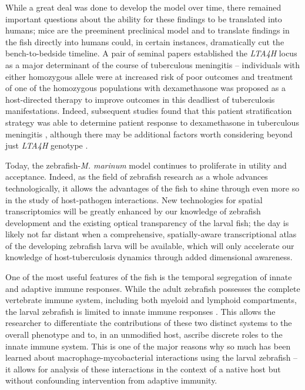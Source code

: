 While a great deal was done to develop the model over time, there remained important questions about the ability for these findings to be translated into humans; mice are the preeminent preclinical model and to translate findings in the fish directly into humans could, in certain instances, dramatically cut the bench-to-bedside timeline. A pair of seminal papers \citep{Tobin2010, Tobin2012} established the \textit{LTA4H} locus as a major determinant of the course of tuberculous meningitis -- individuals with either homozygous allele were at increased risk of poor outcomes and treatment of one of the homozygous populations with dexamethasone was proposed as a host-directed therapy to improve outcomes in this deadliest of tuberculosis manifestations. Indeed, subsequent studies found that this patient stratification strategy was able to determine patient response to dexamethasone in tuberculous meningitis \citep{Thuong2017, Thwaites2013, Thwaites2017, Davis2018, Prasad2016}, although there may be additional factors worth considering beyond just \textit{LTA4H} genotype \citep{Siddiqi2021}.

Today, the zebrafish-\textit{M. marinum} model continues to proliferate in utility and acceptance. Indeed, as the field of zebrafish research as a whole advances technologically, it allows the advantages of the fish to shine through even more so in the study of host-pathogen interactions. New technologies for spatial transcriptomics will be greatly enhanced by our knowledge of zebrafish development and the existing optical transparency of the larval fish; the day is likely not far distant when a comprehensive, spatially-aware transcriptional atlas of the developing zebrafish larva will be available, which will only accelerate our knowledge of host-tuberculosis dynamics through added dimensional awareness.

One of the most useful features of the fish is the temporal segregation of innate and adaptive immune responses. While the adult zebrafish possesses the complete vertebrate immune system, including both myeloid and lymphoid compartments, the larval zebrafish is limited to innate immune responses \citep{Cronan2014}. This allows the researcher to differentiate the contributions of these two distinct systems to the overall phenotype and to, in an unmodified host, ascribe discrete roles to the innate immune system. This is one of the major reasons why so much has been learned about macrophage-mycobacterial interactions using the larval zebrafish -- it allows for analysis of these interactions in the context of a native host but without confounding intervention from adaptive immunity.

